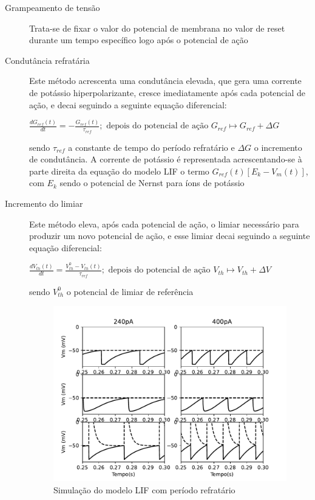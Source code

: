 \begin{description}
	\item[Grampeamento de tensão] Trata-se de fixar o valor do potencial de membrana no valor de reset durante um tempo específico logo após o potencial de ação
	
	\item[Condutância refratária] Este método acrescenta uma condutância elevada, que gera uma corrente de potássio hiperpolarizante, cresce imediatamente após cada potencial de ação, e decai seguindo a seguinte equação diferencial:
	
	$
	\frac{dG_{ref}(t)}{dt} = -\frac{G_{ref}(t)}{\tau_{ref}};\text{ depois do potencial de ação } G_{ref} \mapsto G_{ref} + \Delta G
	$
	
	sendo $\tau_{ref}$ a constante de tempo do período refratário e $\Delta G$ o incremento de condutância. A corrente de potássio é representada acrescentando-se à parte direita da equação do modelo LIF o termo $G_{ref}(t)[E_k-V_m(t)]$, com $E_k$ sendo o potencial de Nernst para íons de potássio
	
	\item[Incremento do limiar] Este método eleva, após cada potencial de ação, o limiar necessário para produzir um novo potencial de ação, e esse limiar decai seguindo a seguinte equação diferencial:
	
	$
	\frac{dV_{th}(t)}{dt} = \frac{V^0_{th}-V_{th}(t)}{\tau_{ref}};\text{ depois do potencial de ação } V_{th} \mapsto V_{th} + \Delta V
	$
	
	sendo $V^0_{th}$ o potencial de limiar de referência
	
	\begin{figure}[h!]
		\centering
		\caption{Simulação do modelo LIF com período refratário}
		\label{fig:lifrefratario}
		\includegraphics[width=0.7\linewidth]{figs/lif_refratario}
	\end{figure}
	
\end{description}

